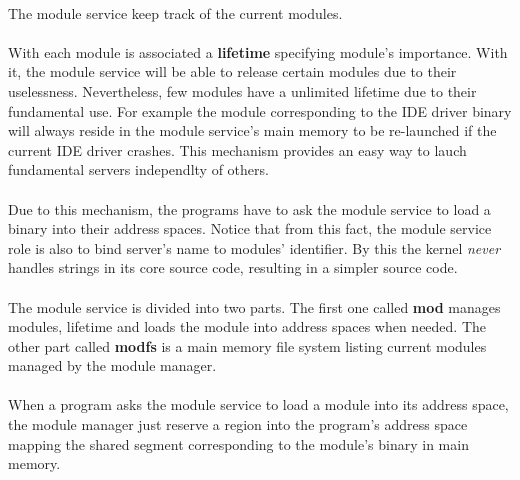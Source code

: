 \documentclass[10pt,a4wide]{article}
\begin{document}
\begin{multicols}{2}
\paragraph{}

The module service keep track of the current modules.

\paragraph{}

With each module is associated a \textbf{lifetime} specifying module's
importance. With it, the module service will be able to release certain
modules due to their uselessness. Nevertheless, few modules have a
unlimited lifetime due to their fundamental use. For example the module
corresponding to the IDE driver binary will always reside in the module
service's main memory to be re-launched if the current IDE driver crashes.
This mechanism provides an easy way to lauch fundamental servers independlty
of others.

\paragraph{}

Due to this mechanism, the programs have to ask the module service to load
a binary into their address spaces. Notice that from this fact, the module
service role is also to bind server's name to modules' identifier. By this
the kernel \textit{never} handles strings in its core source code, resulting
in a simpler source code.

\paragraph{}

The module service is divided into two parts. The first one called \textbf{mod}
manages modules, lifetime and loads the module into address spaces when needed.
The other part called \textbf{modfs} is a main memory file system listing
current modules managed by the module manager.

\paragraph{}

When a program asks the module service to load a module into its address
space, the module manager just reserve a region into the program's address
space mapping the shared segment corresponding to the module's binary in
main memory.


\end{multicols}
\end{document}
